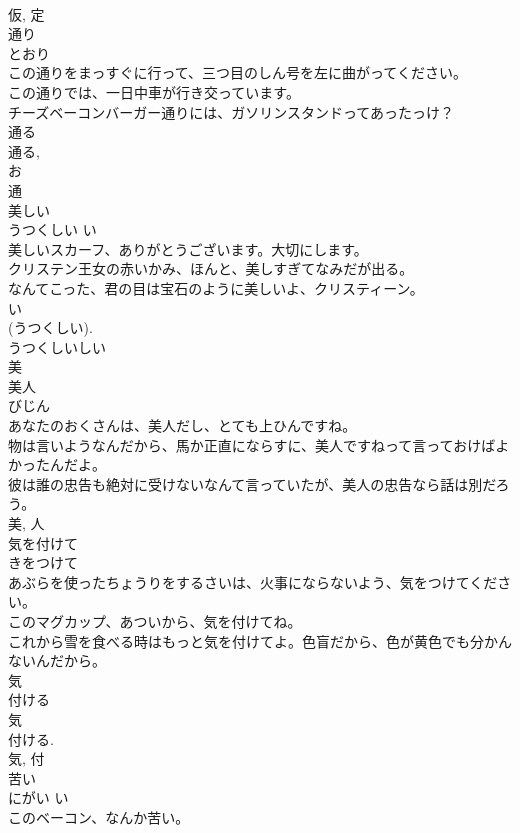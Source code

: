 \documentclass[8pt]{extreport}
\begin{document}
\begin{CJK}{UTF8}{min}
\\	仮, 定	
\\	通り	
\\	とおり	
\\	この通りをまっすぐに行って、三つ目のしん号を左に曲がってください。	
\\	この通りでは、一日中車が行き交っています。	
\\	チーズベーコンバーガー通りには、ガソリンスタンドってあったっけ？	
\\	通る 
\\	通る, 
\\	お 
\\	通	
\\	美しい	
\\	うつくしい	い 
\\	美しいスカーフ、ありがとうございます。大切にします。	
\\	クリステン王女の赤いかみ、ほんと、美しすぎてなみだが出る。	
\\	なんてこった、君の目は宝石のように美しいよ、クリスティーン。	
\\	い 
\\	(うつくしい). 
\\	うつくしいしい 
\\	美	
\\	美人	
\\	びじん	
\\	あなたのおくさんは、美人だし、とても上ひんですね。	
\\	物は言いようなんだから、馬か正直にならすに、美人ですねって言っておけばよかったんだよ。	
\\	彼は誰の忠告も絶対に受けないなんて言っていたが、美人の忠告なら話は別だろう。	
\\	美, 人	
\\	気を付けて	
\\	きをつけて	
\\	あぶらを使ったちょうりをするさいは、火事にならないよう、気をつけてください。	
\\	このマグカップ、あついから、気を付けてね。	
\\	これから雪を食べる時はもっと気を付けてよ。色盲だから、色が黄色でも分かんないんだから。	
\\	気 
\\	付ける 
\\	気 
\\	付ける. 
\\	気, 付	
\\	苦い	
\\	にがい	い 
\\	このベーコン、なんか苦い。	

\end{CJK}
\end{document}

